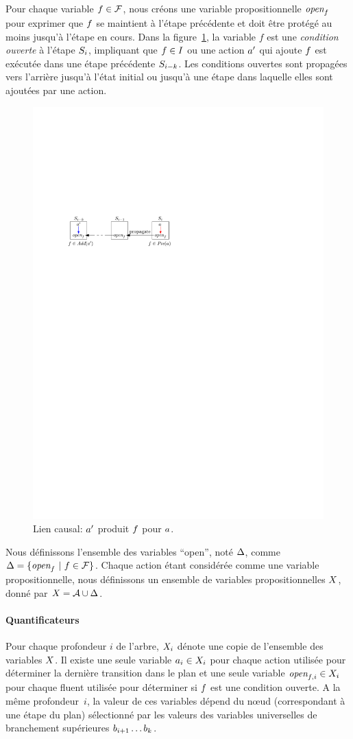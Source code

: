 Pour chaque variable $\f\in\F$, nous créons une variable propositionnelle $\openSingle{\f}$ pour exprimer que $\f$ se maintient à l'étape précédente et doit être protégé au moins jusqu'à l'étape en cours.
Dans la figure~\ref{fig:causal-link-cte}, la variable $f$ est une \textit {condition ouverte} à l'étape $\S_i$, impliquant que $\f\in\I$ ou une action $\b$ qui ajoute $\f$
est exécutée dans une étape précédente $\S_{i-k}$.
Les conditions ouvertes sont propagées vers l'arrière jusqu'à l'état initial ou jusqu'à une étape dans laquelle elles sont ajoutées par une action.


\begin{figure}[hb!]\centering
	\includegraphics[width=.4\textwidth]{figures/transitions}
    \caption{Lien causal: $\b$ produit $\f$ pour $\a$.}
    \label{fig:causal-link-cte}
\end{figure}

Nous définissons l'ensemble des variables ``open'', noté $\openSet$, comme $\openSet = \{\openSingle{\f} ~|~ \f \in \F \}$. Chaque action étant considérée comme une variable propositionnelle, nous définissons un ensemble de variables propositionnelles $\X$, donné par $\X = \A \cup \openSet$.


\paragraph*{Quantificateurs}

Pour chaque profondeur $i$ de l'arbre, $\X_i$ dénote une copie de l'ensemble des variables $\X$. Il existe une seule variable $\a_{i}\in X_{i}$ pour chaque action utilisée pour déterminer la dernière transition dans le plan et une seule variable $\open{\f}{i}\in X_{i}$ pour chaque fluent utilisée pour déterminer si $\f$ est une condition ouverte. A la même profondeur~$i$, la valeur de ces variables dépend du n\oe ud (correspondant à une étape du plan) sélectionné par les valeurs des variables universelles de branchement supérieures $b_{i+1}\ldots b_{\depth}$.


